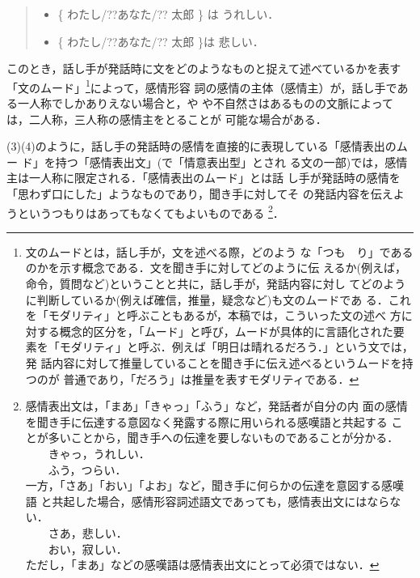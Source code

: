 \vspace{0.3cm}
\begin{quote}
\begin{itemize}
 \item[(1)] \{ わたし/??あなた/?? 太郎 \} は うれしい．
 \item[(2)] \{ わたし/??あなた/?? 太郎 \}は 悲しい．
\end{itemize}
\end{quote}
\vspace{0.3cm}

このとき，話し手が発話時に文をどのようなものと捉えて述べているかを表す
「文のムード」\footnote{文のムードとは，話し手が，文を述べる際，どのよう
な「つも　り」であるのかを示す概念である．文を聞き手に対してどのように伝
えるか(例えば，命令，質問など)ということと共に，話し手が，発話内容に対し
てどのように判断しているか(例えば確信，推量，疑念など)も文のムードであ
る．これを「モダリティ」と呼ぶこともあるが，本稿では，こういった文の述べ
方に対する概念的区分を，「ムード」と呼び，ムードが具体的に言語化された要
素を「モダリティ」と呼ぶ．例えば「明日は晴れるだろう．」という文では，発
話内容に対して推量していることを聞き手に伝え述べるというムードを持つのが
普通であり，「だろう」は推量を表すモダリティである．}によって，感情形容
詞の感情の主体（感情主）が，話し手である一人称でしかありえない場合と，や
や不自然さはあるものの文脈によっては，二人称，三人称の感情主をとることが
可能な場合がある\cite{東1997,益岡1997}．

(3)(4)のように，話し手の発話時の感情を直接的に表現している「感情表出のムー
ド」を持つ「感情表出文」(\cite{益岡1991,益岡1997}で「情意表出型」とされ
る文の一部)では，感情主は一人称に限定される．「感情表出のムード」とは話
し手が発話時の感情を「思わず口にした」ようなものであり，聞き手に対してそ
の発話内容を伝えようというつもりはあってもなくてもよいものである
\footnote{感情表出文は，「まあ」「きゃっ」「ふう」など，発話者が自分の内
面の感情を聞き手に伝達する意図なく発露する際に用いられる感嘆語と共起する
ことが多いことから，聞き手への伝達を要しないものであることが分かる．\\
　　きゃっ，うれしい．\\
　　ふう，つらい．\\
一方，「さあ」「おい」「よお」など，聞き手に何らかの伝達を意図する感嘆語
と共起した場合，感情形容詞述語文であっても，感情表出文にはならない．\\
　　さあ，悲しい．\\
　　おい，寂しい．\\
ただし，「まあ」などの感嘆語は感情表出文にとって必須ではない．}．

